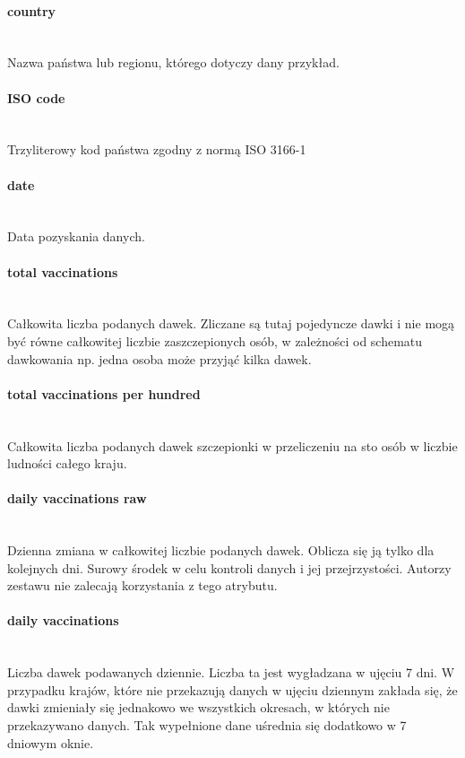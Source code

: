 \documentclass[12pt, oneside]{article}
\begin{document}
\paragraph{country}
\mbox{}\\
Nazwa państwa lub regionu, którego dotyczy dany przykład.

\paragraph{ISO code}
\mbox{}\\
Trzyliterowy kod państwa zgodny z normą ISO 3166-1


\paragraph{date}
\mbox{}\\
Data pozyskania danych.


\paragraph{total vaccinations}
\mbox{}\\
Całkowita liczba podanych dawek. Zliczane są tutaj pojedyncze dawki i nie mogą być
równe całkowitej liczbie zaszczepionych osób, w zależności od schematu dawkowania
np. jedna osoba może przyjąć kilka dawek.


\paragraph{total vaccinations per hundred}
\mbox{}\\
Całkowita liczba podanych dawek szczepionki w przeliczeniu na sto osób w liczbie ludności całego kraju.


\paragraph{daily vaccinations raw}
\mbox{}\\
Dzienna zmiana w całkowitej liczbie podanych dawek. Oblicza się ją tylko dla kolejnych
dni. Surowy środek w celu kontroli danych i jej przejrzystości. Autorzy zestawu nie
zalecają korzystania z tego atrybutu.

\paragraph{daily vaccinations}
\mbox{}\\
Liczba dawek podawanych dziennie. Liczba ta jest wygładzana w ujęciu 7 dni. W przypadku krajów, które nie przekazują danych w ujęciu dziennym zakłada się, że dawki
zmieniały się jednakowo we wszystkich okresach, w których nie przekazywano danych.
Tak wypełnione dane uśrednia się dodatkowo w 7 dniowym oknie.
\end{document}
